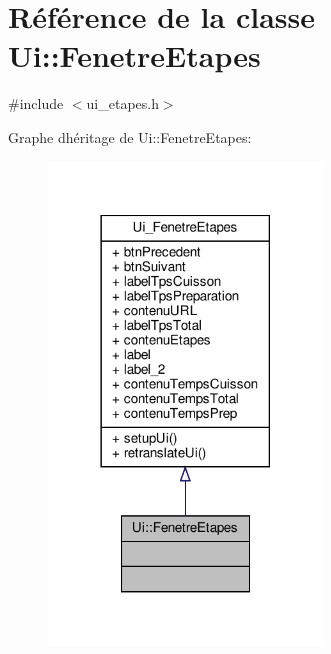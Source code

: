 \hypertarget{class_ui_1_1_fenetre_etapes}{}\section{Référence de la classe Ui\+:\+:Fenetre\+Etapes}
\label{class_ui_1_1_fenetre_etapes}


{\ttfamily \#include $<$ui\+\_\+etapes.\+h$>$}



Graphe d\textquotesingle{}héritage de Ui\+:\+:Fenetre\+Etapes\+:
\nopagebreak
\begin{figure}[H]
\begin{center}
\leavevmode
\includegraphics[width=206pt]{class_ui_1_1_fenetre_etapes__inherit__graph}
\end{center}
\end{figure}


